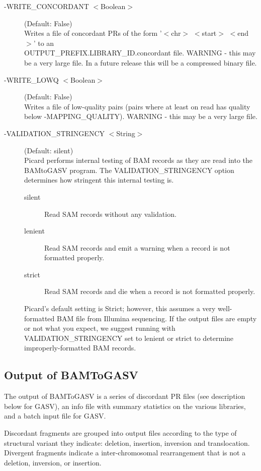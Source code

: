 \documentclass[11pt]{article}
\begin{document}
\begin{description}
\item[-WRITE\_CONCORDANT $<$Boolean$>$] (Default: False)\\
Writes a file of concordant PRs of the form '$<$chr$>$ $<$start$>$ $<$end$>$' to an  \\ OUTPUT\_PREFIX.LIBRARY\_ID.concordant file.  WARNING - this may be a very large file.  In a future release this will be a compressed binary file.

\item[-WRITE\_LOWQ $<$Boolean$>$](Default: False)\\
Writes a file of low-quality pairs (pairs where at least on read has quality below -MAPPING\_QUALITY).  WARNING - this may be a very large file.

\item[-VALIDATION\_STRINGENCY $<$String$>$] (Default: silent)\\
Picard performs internal testing of BAM records as they are read into the BAMtoGASV program.  The VALIDATION\_STRINGENCY option determines how stringent this internal testing is.  
\begin{description}
\item[silent] Read SAM records without any validation. 
\item[lenient] Read SAM records and emit a warning when a record is not formatted properly. 
\item[strict] Read SAM records and die when a record is not formatted properly.
\end{description}
Picard's default setting is Strict; however, this assumes a very well-formatted BAM file from Illumina sequencing.  If the output files are empty or not what you expect, we suggest running with VALIDATION\_STRINGENCY set to lenient or strict to determine improperly-formatted BAM records.
\end{description}
 
\subsection{Output of BAMToGASV}

The output of BAMToGASV is a series of discordant PR files (see description below for GASV), an info file with summary statistics on the various libraries, and a batch input file for GASV.  

Discordant fragments are grouped into output files according to the type of structural variant they indicate: deletion, insertion, inversion and translocation. Divergent fragments indicate a inter-chromosomal rearrangement that is not a deletion, inversion, or insertion.
\end{document}
